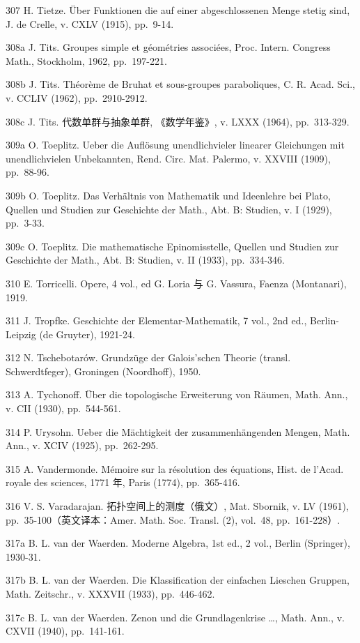 307 H. Tietze. Über Funktionen die auf einer abgeschlossenen Menge stetig sind, J. de Crelle, v. CXLV (1915), pp.~9-14.

308a J. Tits. Groupes simple et géométries associées, Proc. Intern. Congress Math., Stockholm, 1962, pp.~197-221.

308b J. Tits. Théorème de Bruhat et sous-groupes paraboliques, C. R. Acad. Sci., v. CCLIV (1962), pp.~2910-2912.

308c J. Tits. 代数单群与抽象单群, 《数学年鉴》, v. LXXX (1964), pp.~313-329.

309a O. Toeplitz. Ueber die Auflösung unendlichvieler linearer Gleichungen mit unendlichvielen Unbekannten, Rend. Circ. Mat. Palermo, v. XXVIII (1909), pp.~88-96.

309b O. Toeplitz. Das Verhältnis von Mathematik und Ideenlehre bei Plato, Quellen und Studien zur Geschichte der Math., Abt. B: Studien, v. I (1929), pp.~3-33.

309c O. Toeplitz. Die mathematische Epinomisstelle, Quellen und Studien zur Geschichte der Math., Abt. B: Studien, v. II (1933), pp.~334-346.

310 E. Torricelli. Opere, 4 vol., ed G. Loria 与 G. Vassura, Faenza (Montanari), 1919.

311 J. Tropfke. Geschichte der Elementar-Mathematik, 7 vol., 2nd ed., Berlin-Leipzig (de Gruyter), 1921-24.

312 N. Tschebotarów. Grundzüge der Galois'schen Theorie (transl. Schwerdtfeger), Groningen (Noordhoff), 1950.

313 A. Tychonoff. Über die topologische Erweiterung von Räumen, Math. Ann., v. CII (1930), pp.~544-561.

314 P. Urysohn. Ueber die Mächtigkeit der zusammenhängenden Mengen, Math. Ann., v. XCIV (1925), pp.~262-295.

315 A. Vandermonde. Mémoire sur la résolution des équations, Hist. de l'Acad. royale des sciences, 1771 年, Paris (1774), pp.~365-416.

316 V. S. Varadarajan. 拓扑空间上的测度（俄文）, Mat. Sbornik, v. LV (1961), pp.~35-100（英文译本：Amer. Math. Soc. Transl. (2), vol.~48, pp.~161-228）.

317a B. L. van der Waerden. Moderne Algebra, 1st ed., 2 vol., Berlin (Springer), 1930-31.

317b B. L. van der Waerden. Die Klassification der einfachen Lieschen Gruppen, Math. Zeitschr., v. XXXVII (1933), pp.~446-462.

317c B. L. van der Waerden. Zenon und die Grundlagenkrise \ldots, Math. Ann., v. CXVII (1940), pp.~141-161.

